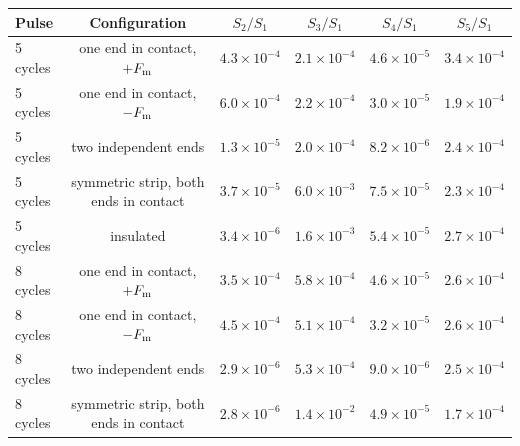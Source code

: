 \begin{tabular}{lccccc}
\hline\hline
Pulse & Configuration & $S_2/S_1$ & $S_3/S_1$ & $S_4/S_1$ & $S_5/S_1$ \\
\hline
5 cycles & one end in contact, $+F_{\rm m}$ & $4.3\times10^{-4}$ & $2.1\times10^{-4}$ & $4.6\times10^{-5}$ & $3.4\times10^{-4}$ \\
5 cycles & one end in contact, $-F_{\rm m}$ & $6.0\times10^{-4}$ & $2.2\times10^{-4}$ & $3.0\times10^{-5}$ & $1.9\times10^{-4}$ \\
5 cycles & two independent ends & $1.3\times10^{-5}$ & $2.0\times10^{-4}$ & $8.2\times10^{-6}$ & $2.4\times10^{-4}$ \\
5 cycles & symmetric strip, both ends in contact & $3.7\times10^{-5}$ & $6.0\times10^{-3}$ & $7.5\times10^{-5}$ & $2.3\times10^{-4}$ \\
5 cycles & insulated & $3.4\times10^{-6}$ & $1.6\times10^{-3}$ & $5.4\times10^{-5}$ & $2.7\times10^{-4}$ \\
\hline
8 cycles & one end in contact, $+F_{\rm m}$ & $3.5\times10^{-4}$ & $5.8\times10^{-4}$ & $4.6\times10^{-5}$ & $2.6\times10^{-4}$ \\
8 cycles & one end in contact, $-F_{\rm m}$ & $4.5\times10^{-4}$ & $5.1\times10^{-4}$ & $3.2\times10^{-5}$ & $2.6\times10^{-4}$ \\
8 cycles & two independent ends & $2.9\times10^{-6}$ & $5.3\times10^{-4}$ & $9.0\times10^{-6}$ & $2.5\times10^{-4}$ \\
8 cycles & symmetric strip, both ends in contact & $2.8\times10^{-6}$ & $1.4\times10^{-2}$ & $4.9\times10^{-5}$ & $1.7\times10^{-4}$ \\
\hline\hline
\end{tabular}
